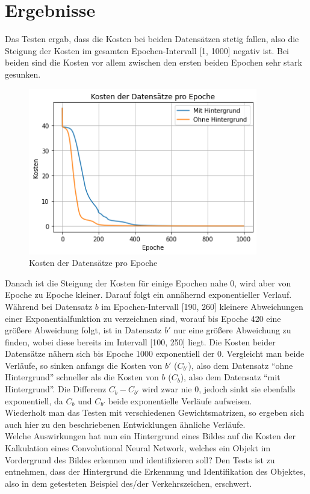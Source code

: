 \documentclass[paper=A4,pagesize=auto,12pt,headinclude=true,footinclude=true,BCOR=0mm,DIV=calc]{scrartcl}
\newcommand{\sectionspace}{
	\vspace{0.5cm}
}
\begin{document}
\newpage
\sectionspace
\section{Ergebnisse}
Das Testen ergab, dass die Kosten bei beiden Datensätzen stetig fallen, also die Steigung der Kosten im gesamten Epochen-Intervall [1, 1000] negativ ist. Bei beiden sind die Kosten vor allem zwischen den ersten beiden Epochen sehr stark gesunken. 
\begin{figure}
	\centering
	\includegraphics[width=10cm]{"images/test_plot.png"}
	\caption{Kosten der Datensätze pro Epoche}
	\label{testplot1}
\end{figure}
Danach ist die Steigung der Kosten für einige Epochen nahe 0, wird aber von Epoche zu Epoche kleiner. Darauf folgt ein annähernd exponentieller Verlauf. Während bei Datensatz $b$ im Epochen-Intervall [190, 260] kleinere Abweichungen einer Exponentialfunktion zu verzeichnen sind, worauf bis Epoche 420 eine größere Abweichung folgt, ist in Datensatz $b'$ nur eine größere Abweichung zu finden, wobei diese bereits im Intervall [100, 250] liegt. Die Kosten beider Datensätze nähern sich bis Epoche 1000 exponentiell der 0. Vergleicht man beide Verläufe, so sinken anfangs die Kosten von $b'$ ($C_{b'}$), also dem Datensatz ``ohne Hintergrund'' schneller als die Kosten von $b$ ($C_{b}$), also dem Datensatz ``mit Hintergrund''. Die Differenz $C_{b}-C_{b'}$ wird zwar nie 0, jedoch sinkt sie ebenfalls exponentiell, da $C_{b}$ und $C_{b'}$ beide exponentielle Verläufe aufweisen. \\
Wiederholt man das Testen mit verschiedenen Gewichtsmatrizen, so ergeben sich auch hier zu den beschriebenen Entwicklungen ähnliche Verläufe. \\
Welche Auswirkungen hat nun ein Hintergrund eines Bildes auf die Kosten der Kalkulation eines Convolutional Neural Network, welches ein Objekt im Vordergrund des Bildes erkennen und identifizieren soll? Den Tests ist zu entnehmen, dass der Hintergrund die Erkennung und Identifikation des Objektes, also in dem getesteten Beispiel des/der Verkehrszeichen, erschwert.
\end{document}
